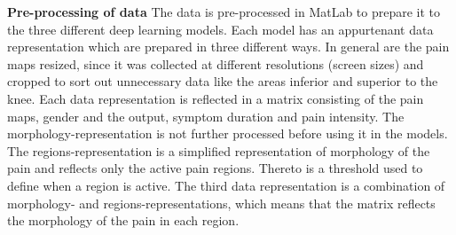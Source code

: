 \noindent
\textbf{Pre-processing of data}\newline
\noindent
The data is pre-processed in MatLab to prepare it to the three different deep learning models. Each model has an appurtenant data representation which are prepared in three different ways. In general are the pain maps resized, since it was collected at different resolutions (screen sizes) and cropped to sort out unnecessary data like the areas inferior and superior to the knee. Each data representation is reflected in a matrix consisting of the pain maps, gender and the output, symptom duration and pain intensity. The morphology-representation is not further processed before using it in the models. 
The regions-representation is a simplified representation of morphology of the pain and reflects only the active pain regions. Thereto is a threshold used to define when a region is active. The third data representation is a combination of morphology- and regions-representations, which means that the matrix reflects the morphology of the pain in each region. 

